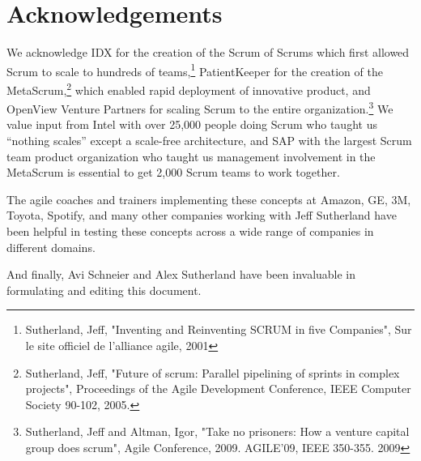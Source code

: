 \documentclass[12pt,a4paper,parskip=full]{scrartcl}
\begin{document}
\section{Acknowledgements}
We acknowledge IDX for the creation of the Scrum of Scrums which first
allowed Scrum to scale to hundreds of teams,\footnote{Sutherland, Jeff,
"Inventing and Reinventing SCRUM in five Companies", Sur le site officiel
de l'alliance agile, 2001} PatientKeeper for the creation of the
MetaScrum,\footnote{Sutherland, Jeff, "Future of scrum: Parallel pipelining
of sprints in complex projects", Proceedings of the Agile Development
Conference,  IEEE Computer Society 90-102,  2005.} which enabled rapid
deployment of innovative product, and OpenView Venture Partners for scaling
Scrum to the entire organization.\footnote{Sutherland, Jeff and Altman,
Igor, "Take no prisoners: How a venture capital group does scrum", Agile
Conference, 2009. AGILE'09, IEEE 350-355.  2009} We value input from Intel
with over 25,000 people doing Scrum who taught us ``nothing scales'' except
a scale-free architecture, and SAP with the largest Scrum team product
organization who taught us management involvement in the MetaScrum is
essential to get 2,000 Scrum teams to work together.

The agile coaches and trainers implementing these concepts at Amazon, GE,
3M, Toyota, Spotify, and many other companies working with Jeff Sutherland
have been helpful in testing these concepts across a wide range of
companies in different domains.

And finally, Avi Schneier and Alex Sutherland have been invaluable in
formulating and editing this document.

\pagebreak

\printbibliography
\end{document}
